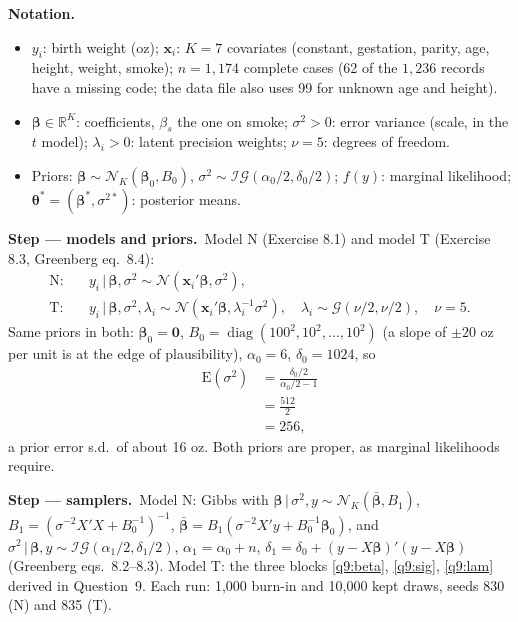 \documentclass[11pt,a4paper]{article}
\numberwithin{equation}{questao}
\newenvironment{notacao}{\par\smallskip\noindent\textbf{Notation.}\begin{itemize}[leftmargin=1.4em,topsep=1pt,itemsep=0pt]\small}{\end{itemize}}
\newcommand{\passo}[2]{\par\smallskip\noindent\textbf{Step --- #1.}~#2}
\newcommand{\E}{\mathrm{E}}
\newcommand{\N}{\mathcal{N}}
\newcommand{\IG}{\mathcal{IG}}
\newcommand{\Ga}{\mathcal{G}}
\begin{document}
\begin{sol}
\begin{notacao}
\item $y_i$: birth weight (oz); $\mathbf{x}_i$: $K=7$ covariates (constant, gestation, parity, age, height, weight, smoke); $n=1{,}174$ complete cases (62 of the $1{,}236$ records have a missing code; the data file also uses 99 for unknown age and height).
\item $\boldsymbol\beta\in\mathbb{R}^K$: coefficients, $\beta_{s}$ the one on smoke; $\sigma^2>0$: error variance (scale, in the $t$ model); $\lambda_i>0$: latent precision weights; $\nu=5$: degrees of freedom.
\item Priors: $\boldsymbol\beta\sim\N_K(\boldsymbol\beta_0,B_0)$, $\sigma^2\sim\IG(\alpha_0/2,\delta_0/2)$; $f(y)$: marginal likelihood; $\boldsymbol\theta^*=(\boldsymbol\beta^*,\sigma^{2*})$: posterior means.
\end{notacao}

\passo{models and priors}{Model N (Exercise 8.1) and model T (Exercise 8.3, Greenberg eq.~8.4):
\begin{align}
\text{N:}\quad & y_i\,|\,\boldsymbol\beta,\sigma^2\sim\N(\mathbf{x}_i'\boldsymbol\beta,\sigma^2), \label{q8:N}\\
\text{T:}\quad & y_i\,|\,\boldsymbol\beta,\sigma^2,\lambda_i\sim\N(\mathbf{x}_i'\boldsymbol\beta,\lambda_i^{-1}\sigma^2),\quad \lambda_i\sim\Ga(\nu/2,\nu/2),\quad\nu=5. \label{q8:T}
\end{align}
Same priors in both: $\boldsymbol\beta_0=\mathbf0$, $B_0=\operatorname{diag}(100^2,10^2,\dots,10^2)$ (a slope of
$\pm20$ oz per unit is at the edge of plausibility), $\alpha_0=6$, $\delta_0=1024$, so
\begin{align*}
\E(\sigma^2)&=\frac{\delta_0/2}{\alpha_0/2-1}\\
&=\frac{512}{2}\\
&=256,
\end{align*}
a prior error s.d.\ of about 16 oz. Both priors are proper, as marginal likelihoods require.}

\passo{samplers}{Model N: Gibbs with $\boldsymbol\beta\,|\,\sigma^2,y\sim\N_K(\bar{\boldsymbol\beta},B_1)$,
$B_1=(\sigma^{-2}X'X+B_0^{-1})^{-1}$, $\bar{\boldsymbol\beta}=B_1(\sigma^{-2}X'y+B_0^{-1}\boldsymbol\beta_0)$, and
$\sigma^2\,|\,\boldsymbol\beta,y\sim\IG(\alpha_1/2,\delta_1/2)$, $\alpha_1=\alpha_0+n$,
$\delta_1=\delta_0+(y-X\boldsymbol\beta)'(y-X\boldsymbol\beta)$ (Greenberg eqs.~8.2--8.3). Model T: the three blocks
\eqref{q9:beta}, \eqref{q9:sig}, \eqref{q9:lam} derived in Question~9. Each run: 1{,}000 burn-in and 10{,}000
kept draws, seeds 830 (N) and 835 (T).}


\end{sol}
\end{document}
